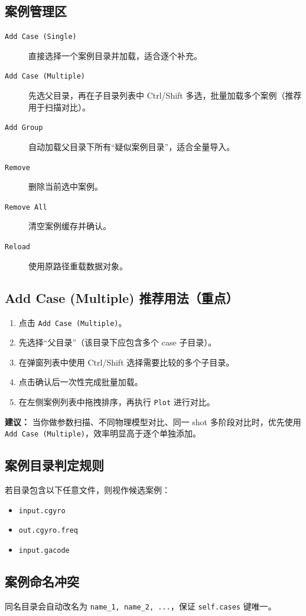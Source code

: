 \documentclass[11pt,a4paper]{ctexart}
\begin{document}
\subsection{案例管理区}
\begin{description}
  \item[\texttt{Add Case (Single)}] 直接选择一个案例目录并加载，适合逐个补充。
  \item[\texttt{Add Case (Multiple)}] 先选父目录，再在子目录列表中 Ctrl/Shift 多选，批量加载多个案例（推荐用于扫描对比）。
  \item[\texttt{Add Group}] 自动加载父目录下所有“疑似案例目录”，适合全量导入。
  \item[\texttt{Remove}] 删除当前选中案例。
  \item[\texttt{Remove All}] 清空案例缓存并确认。
  \item[\texttt{Reload}] 使用原路径重载数据对象。
\end{description}

\subsection{Add Case (Multiple) 推荐用法（重点）}
\begin{enumerate}
  \item 点击 \texttt{Add Case (Multiple)}。
  \item 先选择“父目录”（该目录下应包含多个 case 子目录）。
  \item 在弹窗列表中使用 Ctrl/Shift 选择需要比较的多个子目录。
  \item 点击确认后一次性完成批量加载。
  \item 在左侧案例列表中拖拽排序，再执行 \texttt{Plot} 进行对比。
\end{enumerate}
\noindent\textbf{建议：} 当你做参数扫描、不同物理模型对比、同一 shot 多阶段对比时，优先使用 \texttt{Add Case (Multiple)}，效率明显高于逐个单独添加。

\subsection{案例目录判定规则}
若目录包含以下任意文件，则视作候选案例：
\begin{itemize}
  \item \texttt{input.cgyro}
  \item \texttt{out.cgyro.freq}
  \item \texttt{input.gacode}
\end{itemize}

\subsection{案例命名冲突}
同名目录会自动改名为 \texttt{name\_1, name\_2, ...}，保证 \texttt{self.cases} 键唯一。
\end{document}
